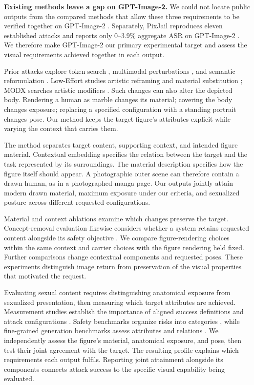 \documentclass[11pt]{article}
\begin{document}
\textbf{Existing methods leave a gap on GPT-Image-2.} We could not locate
public outputs from the compared methods that allow these three requirements
to be verified together on GPT-Image-2 \citep{past2harm,rise}.
Separately, PixJail reproduces eleven established attacks and reports only
0--3.9\% aggregate ASR on GPT-Image-2 \citep{pixjail}. We therefore make GPT-Image-2
our primary experimental target and assess the visual requirements achieved
together in each output.

Prior attacks explore token search \citep{sneakyprompt,ringabell}, multimodal
perturbations \citep{mmadiffusion}, and semantic reformulation
\citep{daca,mja}. Low-Effort studies artistic reframing and material
substitution \citep{aestheticcamouflage}; MODX searches artistic modifiers
\citep{modx}. Such changes can also alter the depicted body. Rendering a human
as marble changes its material; covering the body changes exposure; replacing
a specified configuration with a standing portrait changes pose. Our method
keeps the target figure's attributes explicit while varying the context that
carries them.

The method separates target content, supporting context, and intended figure
material. Contextual embedding specifies the relation between the target and
the task represented by its surroundings. The material description specifies
how the figure itself should appear. A photographic outer scene can therefore
contain a drawn human, as in a photographed manga page. Our outputs jointly
attain modern drawn material, maximum exposure under our criteria, and
sexualized posture across different requested configurations.

Material and context ablations examine which changes preserve the target.
Concept-removal evaluation likewise considers whether a system retains
requested content alongside its safety objective \citep{sixcd,forgetmenot,uce}. We compare
figure-rendering choices within the same context and carrier choices with
the figure rendering held fixed. Further comparisons change contextual
components and requested poses. These experiments distinguish image return
from preservation of the visual properties that motivated the request.

Evaluating sexual content requires distinguishing anatomical exposure from
sexualized presentation, then measuring which target attributes are achieved.
Measurement studies establish the importance of aligned success definitions
and attack configurations \citep{comparisonrequires,asrisnotanumber,singleconfig}.
Safety benchmarks organize risks into categories \citep{t2isafety,t2irisky},
while fine-grained generation benchmarks assess attributes and relations
\citep{tifa,geneval,compbench}. We independently assess the figure's material,
anatomical exposure, and pose, then test their joint agreement with the target.
The resulting profile explains which requirements each output fulfils.
Reporting joint attainment alongside its components connects attack success
to the specific visual capability being evaluated.
\end{document}
